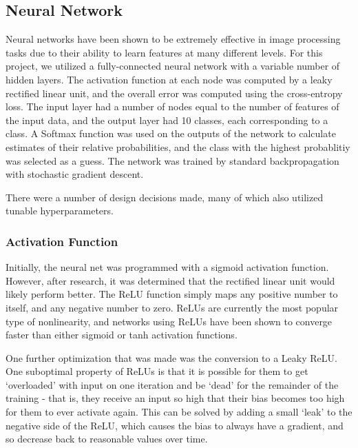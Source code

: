 \documentclass{article} %
\begin{document}

\subsection*{Neural Network}

Neural networks have been shown to be extremely effective in image processing tasks due to their ability to learn features at many different levels. For this project, we utilized a fully-connected neural network with a variable number of hidden layers. The activation function at each node was computed by a leaky rectified linear unit, and the overall error was computed using the cross-entropy loss. The input layer had a number of nodes equal to the number of features of the input data, and the output layer had 10 classes, each corresponding to a class. A Softmax function was used on the outputs of the network to calculate estimates of their relative probabilities, and the class with the highest probablitiy was selected as a guess. The network was trained by standard backpropagation with stochastic gradient descent.

There were a number of design decisions made, many of which also utilized tunable hyperparameters.

\subsubsection*{Activation Function}

Initially, the neural net was programmed with a sigmoid activation function. However, after research, it was determined that the rectified linear unit would likely perform better. The ReLU function simply maps any positive number to itself, and any negative number to zero. ReLUs are currently the most popular type of nonlinearity, and networks using ReLUs have been shown to converge faster than either sigmoid or tanh activation functions.

One further optimization that was made was the conversion to a Leaky ReLU. One suboptimal property of ReLUs is that it is possible for them to get `overloaded' with input on one iteration and be `dead' for the remainder of the training - that is, they receive an input so high that their bias becomes too high for them to ever activate again. This can be solved by adding a small `leak' to the negative side of the ReLU, which causes the bias to always have a gradient, and so decrease back to reasonable values over time.
\end{document}
